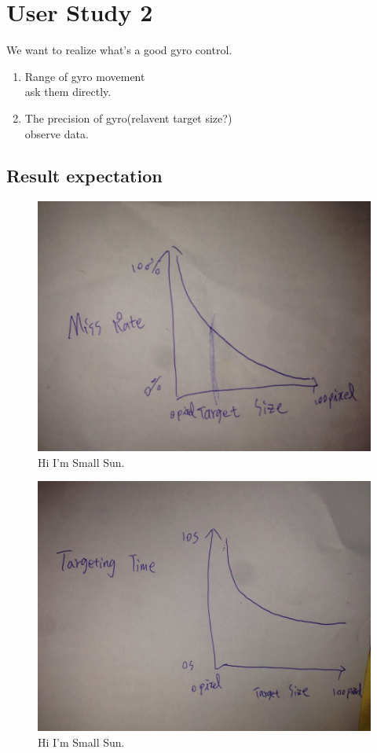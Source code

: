 \section{User Study 2}

We want to realize what's a good gyro control. 

\begin{enumerate}
\item Range of gyro movement\\
ask them directly.
\item The precision of gyro(relavent target size?)\\
observe data.
\end{enumerate}

\subsection{Result expectation}

\begin{figure}[!t]
\centering
\includegraphics[width=0.9\columnwidth]{Figures/US2_missRate.jpg}
\caption{Hi I'm Small Sun.}
\label{fig:PS_Frus}
\end{figure}

\begin{figure}[!t]
\centering
\includegraphics[width=0.9\columnwidth]{Figures/US2_targetingTime.jpg}
\caption{Hi I'm Small Sun.}
\label{fig:PS_Frus}
\end{figure}

